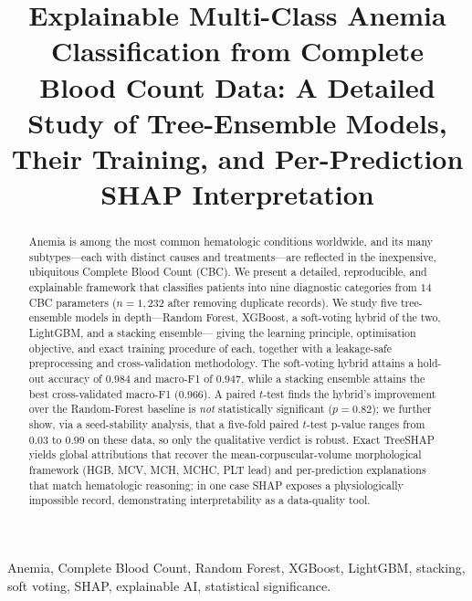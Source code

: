 \documentclass[conference]{IEEEtran}
\begin{document}
\title{Explainable Multi-Class Anemia Classification from Complete\\
Blood Count Data: A Detailed Study of Tree-Ensemble Models,\\
Their Training, and Per-Prediction SHAP Interpretation}

\author{
}

\maketitle

\begin{abstract}
Anemia is among the most common hematologic conditions worldwide, and its many
subtypes---each with distinct causes and treatments---are reflected in the
inexpensive, ubiquitous Complete Blood Count (CBC). We present a detailed,
reproducible, and explainable framework that classifies patients into nine
diagnostic categories from $14$ CBC parameters ($n{=}1{,}232$ after removing
duplicate records). We study five tree-ensemble models in depth---Random Forest,
XGBoost, a soft-voting hybrid of the two, LightGBM, and a stacking ensemble---
giving the learning principle, optimisation objective, and exact training
procedure of each, together with a leakage-safe preprocessing and
cross-validation methodology. The soft-voting hybrid attains a hold-out accuracy of
$0.984$ and macro-F1 of $0.947$, while a stacking ensemble attains the best
cross-validated macro-F1 ($0.966$). A paired
$t$-test finds the hybrid's improvement over the Random-Forest baseline is
\emph{not} statistically significant ($p{=}0.82$); we further show, via a
seed-stability analysis, that a five-fold paired $t$-test p-value ranges from
$0.03$ to $0.99$ on these data, so only the qualitative verdict is robust. Exact
TreeSHAP yields global attributions that recover the mean-corpuscular-volume
morphological framework (HGB, MCV, MCH, MCHC, PLT lead) and per-prediction
explanations that match hematologic reasoning; in one case SHAP exposes a
physiologically impossible record, demonstrating interpretability as a
data-quality tool.
\end{abstract}

\begin{IEEEkeywords}
Anemia, Complete Blood Count, Random Forest, XGBoost, LightGBM, stacking, soft
voting, SHAP, explainable AI, statistical significance.
\end{IEEEkeywords}
\end{document}
